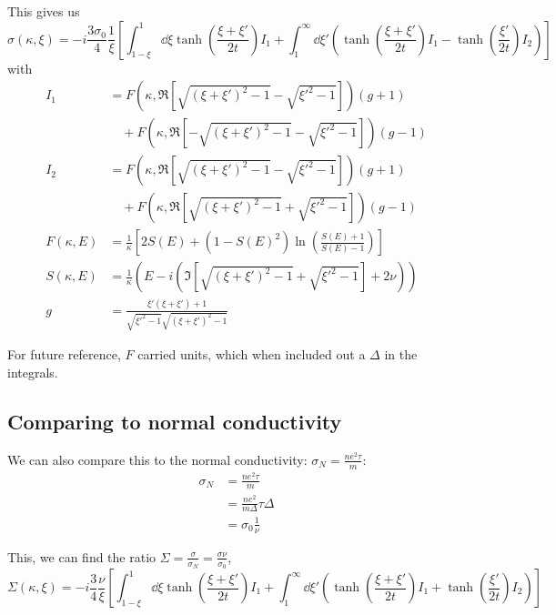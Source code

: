 \documentclass[../../main.tex]{subfiles}
\begin{document}
This gives us 
\begin{equation}
\sigma(\kappa, \xi) = -i \frac{3 \sigma_0}{4} \frac{1}{\xi}\left[\int_{1 - \xi}^{1}\dd{\xi} \tanh(\frac{\xi + \xi'}{2 t}) I_1 + \int_{1}^{\infty} \dd{\xi'} \left( \tanh(\frac{\xi + \xi'}{2t}) I_1  - \tanh(\frac{\xi'}{2t})I_2 \right) \right]
\end{equation}
with 
\begin{align}
I_1 &= F(\kappa, \Re[\sqrt{(\xi + \xi')^2 - 1} - \sqrt{\xi'^2 - 1}]) (g + 1) \nonumber\\
&\quad + F(\kappa, \Re[-\sqrt{(\xi + \xi')^2 - 1} - \sqrt{\xi'^2 - 1}]) (g - 1) \\
I_2 &= F(\kappa, \Re[\sqrt{(\xi + \xi')^2 - 1} - \sqrt{\xi'^2 - 1}]) (g + 1) \nonumber\\
&\quad + F(\kappa, \Re[\sqrt{(\xi + \xi')^2 - 1} + \sqrt{\xi'^2 - 1}]) (g - 1) \\
F(\kappa, E) &= \frac{1}{\kappa} \left[2 S(E) + (1 - S(E)^2)\ln(\frac{S(E) + 1}{S(E) - 1})\right]  \\
S(\kappa, E) &= \frac{1}{\kappa} \left(E - i \left(\Im[\sqrt{(\xi + \xi')^2 - 1} + \sqrt{\xi'^2 - 1}] + 2 \nu \right) \right) \\
g  &= \frac{\xi' \left( \xi + \xi'\right) + 1}{\sqrt{\xi'^2 - 1}\sqrt{(\xi + \xi')^2 - 1}}
\end{align}

For future reference, $F$ carried units, which when included out a $\Delta$ in the integrals.

\subsection{Comparing to normal conductivity} \label{subsec:NamForm.NormalConductivity}
We can also compare this to the normal conductivity: $\sigma_N = \frac{n e^2 \tau}{m}$:
\begin{align}
\sigma_N &= \frac{n e^2 \tau}{m} \\
&= \frac{n e^2}{m \Delta} \tau \Delta \\
&= \sigma_0 \frac{1}{\nu}
\end{align}

This, we can find the ratio $\Sigma = \frac{\sigma}{\sigma_N} = \frac{\sigma \nu}{\sigma_0}$,
\begin{equation}
\Sigma(\kappa, \xi) = -i \frac{3}{4} \frac{\nu}{\xi}\left[\int_{1 - \xi}^{1}\dd{\xi} \tanh(\frac{\xi + \xi'}{2 t}) I_1 + \int_{1}^{\infty} \dd{\xi'} \left( \tanh(\frac{\xi + \xi'}{2t}) I_1  + \tanh(\frac{\xi'}{2t})I_2 \right) \right]
\end{equation}
\end{document}
